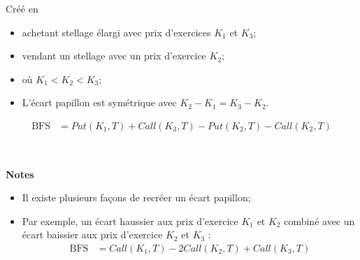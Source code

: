 \documentclass[10pt, french]{article}
\begin{document}
\begin{multicols*}{2}
\begin{definitionNOHFILL}
\begin{center}
\end{center}
\end{definitionNOHFILL}

\begin{definitionNOHFILL}
Créé en 
\begin{itemize}[leftmargin = *]
	\item	achetant stellage élargi avec prix d'exercices $K_{1}$ et $K_{3}$;
	\item	vendant un stellage avec un prix d'exercice $K_{2}$; 
	\item	où $K_{1} < K_{2} < K_{3}$;
	\item	L'écart papillon	 est symétrique avec $K_{2} - K_{1} = K_{3} - K_{2}$.
\end{itemize}

\begin{align*}
	\text{BFS} 
	&=	Put(K_1, T) + Call(K_3, T) - Put(K_2, T) - Call(K_2, T)
\end{align*}

\

\textbf{Notes}
\begin{itemize}[leftmargin = *]
	\item	Il existe plusieurs façons de recréer un écart papillon;
	\item	Par exemple, un écart haussier aux prix d'exercice $K_{1}$ et $K_{2}$ combiné avec un écart baissier aux prix d'exercice $K_{2}$ et $K_{3}$ : 
	\begin{align*}
		\text{BFS} 
		&=	Call(K_1, T) - 2 Call(K_2, T) + Call(K_3, T)
	\end{align*}
\end{itemize}

\begin{center}
	
\end{center}
\end{definitionNOHFILL}


\end{multicols*}
\end{document}
